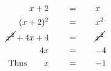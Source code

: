 \begin{align*}
x+2\qquad&\,=\qquad x\\
(x+2)^2\qquad&\,=\qquad x^2\\
\cancel{x^2}+4x+4\qquad&\,=\qquad \cancel{x^2}\\
4x\qquad&\,=\qquad-4\\
\mathrm{Thus}\qquad x\qquad&\,=\qquad-1
\end{align*}
